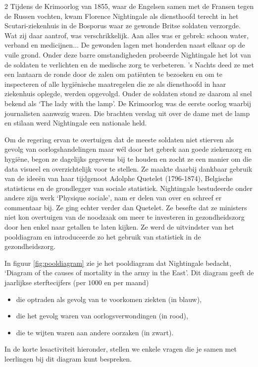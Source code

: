 \begin{multicols}{2}
	Tijdens  de  Krimoorlog van 1855, waar de Engelsen samen met de Fransen tegen de Russen vochten, kwam Florence Nightingale als diensthoofd  terecht  in het Scutari-ziekenhuis in de Bosporus waar ze gewonde Britse soldaten verzorgde.  Wat  zij  daar aantrof, was verschrikkelijk. Aan alles was er gebrek: schoon water, verband en medicijnen$\ldots$ De gewonden lagen met honderden naast elkaar op de vuile grond. Onder deze barre omstandigheden  probeerde  Nightingale  het  lot  van  de soldaten te verlichten en de medische zorg te verbeteren. 's Nachts deed ze met een lantaarn de ronde door de zalen om patiënten te bezoeken en om te inspecteren of alle hygiënische maatregelen die ze als diensthoofd in haar ziekenhuis oplegde, werden opgevolgd. Onder de soldaten stond ze daarom al snel bekend als `The lady with the lamp'. De Krimoorlog was de eerste oorlog waarbij journalisten aanwezig waren. Die brachten verslag uit over de dame met de lamp en stilaan werd Nightingale een nationale held.

	
	Om de regering ervan te overtuigen dat de meeste soldaten niet stierven als gevolg van oorlogshandelingen maar wél door het gebrek aan goede ziekenzorg en hygiëne, begon ze dagelijks gegevens bij te houden en zocht ze een manier om die data visueel en overzichtelijk voor te stellen. Ze maakte daarbij dankbaar gebruik van de ideeën van haar tijdgenoot Adolphe Quetelet (1796‐1874), Belgische statisticus en de grondlegger van sociale statistiek. Nightingale bestudeerde onder andere zijn werk ‘Physique sociale’, nam er delen van over en schreef er commentaar bij. Ze ging echter verder dan Quetelet. Ze besefte dat ze ministers niet kon overtuigen van de noodzaak om meer te investeren in gezondheidszorg door hen enkel naar getallen te laten kijken. Ze werd de uitvindster van het pooldiagram en introduceerde zo het gebruik van statistiek in de gezondheidszorg. 
	
	In figuur \ref{fig:pooldiagram} zie je het pooldiagram dat Nightingale bedacht, `Diagram of the causes of mortality in the army in the East'. Dit diagram geeft de jaarlijkse sterftecijfers (per $1000$ en per maand) 
	\begin{itemize}
		\item die optraden als gevolg van te voorkomen ziekten (in blauw), 
		\item die het gevolg waren van oorlogsverwondingen (in rood),
		\item die te wijten waren aan andere oorzaken (in zwart).
	\end{itemize}


In de korte lesactiviteit hieronder, stellen we enkele vragen die je samen met leerlingen bij dit diagram kunt bespreken.

\end{multicols}


